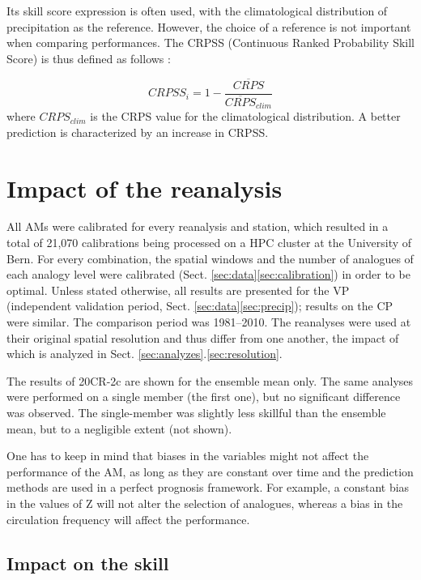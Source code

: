 \documentclass{ametsoc}
\begin{document}
	Its skill score expression is often used, with the climatological distribution of precipitation as the reference. However, the choice of a reference is not important when comparing performances. The CRPSS (Continuous Ranked Probability Skill Score) is thus defined as follows \citep{Bradley2011}:
	
	\begin{equation}
	\label{eq:CRPSS}
	CRPSS_{i} = 1-\frac{\overline{CRPS}}{\overline{CRPS}_{clim}}
	\end{equation}
	where $CRPS_{clim}$ is the CRPS value for the climatological distribution. A better prediction is characterized by an increase in CRPSS.
	
	
	\section{Impact of the reanalysis}
	\label{sec:influence}
	
	All AMs were calibrated for every reanalysis and station, which resulted in a total of 21,070 calibrations being processed on a HPC cluster at the University of Bern. For every combination, the spatial windows and the number of analogues of each analogy level were calibrated (Sect. \ref{sec:data}\ref{sec:calibration}) in order to be optimal. Unless stated otherwise, all results are presented for the VP (independent validation period, Sect. \ref{sec:data}\ref{sec:precip}); results on the CP were similar. The comparison period was 1981--2010. The reanalyses were used at their original spatial resolution and thus differ from one another, the impact of which is analyzed in Sect. \ref{sec:analyzes}.\ref{sec:resolution}.
	
	The results of 20CR-2c are shown for the ensemble mean only. The same analyses were performed on a single member (the first one), but no significant difference was observed. The single-member was slightly less skillful than the ensemble mean, but to a negligible extent (not shown).
	
	One has to keep in mind that biases in the variables might not affect the performance of the AM, as long as they are constant over time and the prediction methods are used in a perfect prognosis framework. For example, a constant bias in the values of Z will not alter the selection of analogues, whereas a bias in the circulation frequency will affect the performance.
	
	
	\subsection{Impact on the skill}
	
\end{document}
